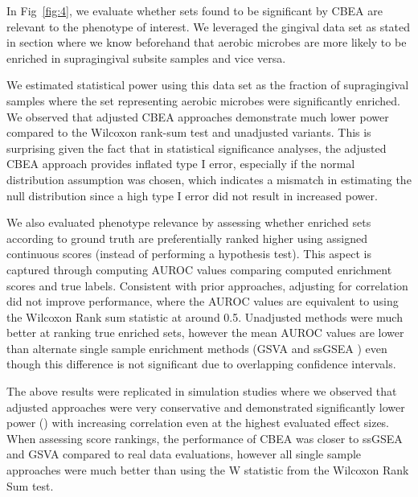 \documentclass[10pt,letterpaper]{article}
\begin{document}
In Fig~\ref{fig:4}, we evaluate whether sets found to be significant by CBEA are relevant to the phenotype of interest. We leveraged the gingival data set as stated in  section where we know beforehand that aerobic microbes are more likely to be enriched in supragingival subsite samples and vice versa. 

We estimated statistical power using this data set as the fraction of supragingival samples where the set representing aerobic microbes were significantly enriched. We observed that adjusted CBEA approaches demonstrate much lower power compared to the Wilcoxon rank-sum test and unadjusted variants. This is surprising given the fact that in statistical significance analyses, the adjusted CBEA approach provides inflated type I error, especially if the normal distribution assumption was chosen, which indicates a mismatch in estimating the null distribution since a high type I error did not result in increased power. 

We also evaluated phenotype relevance by assessing whether enriched sets according to ground truth are preferentially ranked higher using assigned continuous scores (instead of performing a hypothesis test). This aspect is captured through computing AUROC values comparing computed enrichment scores and true labels. Consistent with prior approaches, adjusting for correlation did not improve performance, where the AUROC values are equivalent to using the Wilcoxon Rank sum statistic at around 0.5. Unadjusted methods were much better at ranking true enriched sets, however the mean AUROC values are lower than alternate single sample enrichment methods (GSVA \cite{hanzelmann2013} and ssGSEA \cite{barbie2009}) even though this difference is not significant due to overlapping confidence intervals.  

The above results were replicated in simulation studies where we observed that adjusted approaches were very conservative and demonstrated significantly lower power () with increasing correlation even at the highest evaluated effect sizes. When assessing score rankings, the performance of CBEA was closer to ssGSEA and GSVA compared to real data evaluations, however all single sample approaches were much better than using the W statistic from the Wilcoxon Rank Sum test.   
\end{document}
